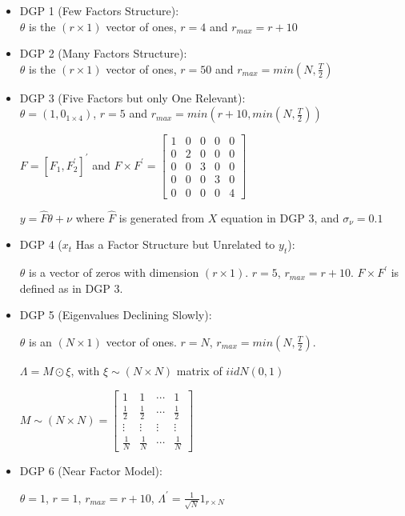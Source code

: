 \begin{itemize}
	\item DGP 1 (Few Factors Structure): \\
$\theta$ is the $(r \times 1)$ vector of ones, $r = 4$ and $r_{max} = r + 10$
	\item DGP 2 (Many Factors Structure): \\
$\theta$ is the $(r \times 1)$ vector of ones, $r = 50$ and $r_{max} = min(N, \frac{T}{2})$
	\item DGP 3 (Five Factors but only One Relevant): \\
$\theta = (1, 0_{1 \times 4})$, $r = 5$ and $r_{max} = min(r + 10, min(N, \frac{T}{2}))$

$F = [F_{1}, F_{2}^{'}]^{'}$ and $F \times F^{'} = \begin{bmatrix} 1 & 0 & 0 & 0 & 0 \\ 0 & 2 & 0 & 0 & 0 \\ 0 & 0 & 3 & 0 & 0 \\ 0 & 0 & 0 & 3 & 0 \\ 0 & 0 & 0 & 0 & 4\end{bmatrix}$

$y = \hat{F} \theta + \nu$ where $\hat{F}$ is generated from $X$ equation in DGP 3, and $\sigma_{\nu} = 0.1$
	\item DGP 4 ($x_{t}$ Has a Factor Structure but Unrelated to $y_{t}$):

$\theta$ is a vector of zeros with dimension $(r \times 1)$. $r = 5$, $r_{max} = r + 10$. $F \times F^{'}$ is defined as in DGP 3. \\

	\item DGP 5 (Eigenvalues Declining Slowly):

$\theta$ is an $(N \times 1)$ vector of ones. $r = N$, $r_{max} = min(N, \frac{T}{2})$.

$\Lambda = M \odot \xi$, with $\xi \sim (N \times N)$ matrix of $iidN(0, 1)$

$M \sim (N \times N) = \begin{bmatrix} 1 & 1 & \dotsb & 1 \\ \frac{1}{2} & \frac{1}{2} & \dotsb & \frac{1}{2} \\ \vdots & \vdots & \vdots & \vdots \\ \frac{1}{N} & \frac{1}{N} & \dotsb & \frac{1}{N}\end{bmatrix}$
	\item DGP 6 (Near Factor Model):

$\theta = 1$, $r = 1$, $r_{max} = r + 10$, $\Lambda^{'} = \frac{1}{\sqrt{N}}1_{r \times N}$
\end{itemize}



